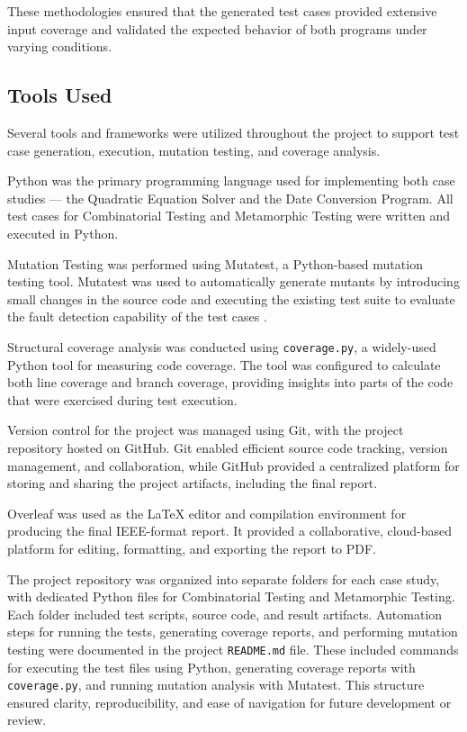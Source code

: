 \documentclass[conference]{IEEEtran}
\begin{document}
These methodologies ensured that the generated test cases provided extensive input coverage and validated the expected behavior of both programs under varying conditions.

\subsection{Tools Used}
Several tools and frameworks were utilized throughout the project to support test case generation, execution, mutation testing, and coverage analysis.

Python was the primary programming language used for implementing both case studies — the Quadratic Equation Solver and the Date Conversion Program. All test cases for Combinatorial Testing and Metamorphic Testing were written and executed in Python.

Mutation Testing was performed using Mutatest, a Python-based mutation testing tool. Mutatest was used to automatically generate mutants by introducing small changes in the source code and executing the existing test suite to evaluate the fault detection capability of the test cases \cite{b6}.

Structural coverage analysis was conducted using \texttt{coverage.py}, a widely-used Python tool for measuring code coverage. The tool was configured to calculate both line coverage and branch coverage, providing insights into parts of the code that were exercised during test execution.

Version control for the project was managed using Git, with the project repository hosted on GitHub. Git enabled efficient source code tracking, version management, and collaboration, while GitHub provided a centralized platform for storing and sharing the project artifacts, including the final report.

Overleaf was used as the LaTeX editor and compilation environment for producing the final IEEE-format report. It provided a collaborative, cloud-based platform for editing, formatting, and exporting the report to PDF.

The project repository was organized into separate folders for each case study, with dedicated Python files for Combinatorial Testing and Metamorphic Testing. Each folder included test scripts, source code, and result artifacts. Automation steps for running the tests, generating coverage reports, and performing mutation testing were documented in the project \texttt{README.md} file. These included commands for executing the test files using Python, generating coverage reports with \texttt{coverage.py}, and running mutation analysis with Mutatest. This structure ensured clarity, reproducibility, and ease of navigation for future development or review.
\end{document}
